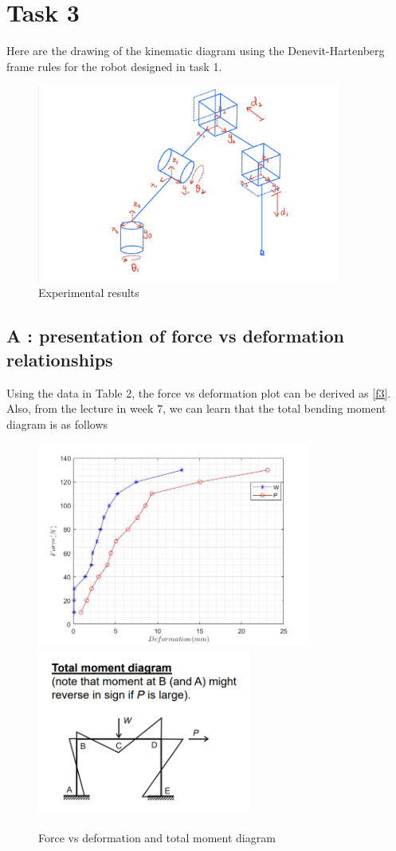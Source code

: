 \section{Task 3}
\FloatBarrier %

Here are the drawing of the kinematic diagram using the Denevit-Hartenberg frame rules for the robot designed in task 1.

\begin{figure}[htbp]
    \centering
    \includegraphics[width=10cm]{./fig/D-H.jpg}
    \caption{Experimental results}
    \label{f5}
\end{figure}



\iffalse
\subsection*{A : presentation of force vs deformation relationships}
Using the data in Table 2, the force vs deformation plot can be derived as \autoref{f3}. Also, from the lecture in week 7, we can learn that the total bending moment diagram is as follows


\begin{figure}[htbp]
    \centering
    \includegraphics[width=9cm]{./fig/17.jpg}
    \includegraphics[width=7cm]{./fig/16.png}
    \caption{Force vs deformation and total moment diagram}
    \label{f4}
\end{figure}


